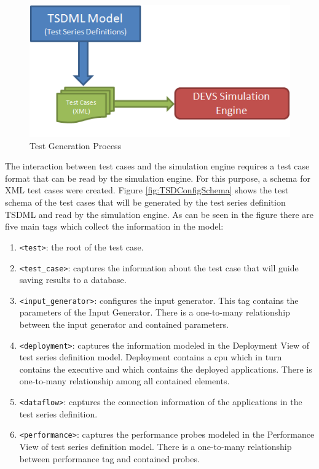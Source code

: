 \begin{figure}
	\centering
		\includegraphics{figures/TSDTestGen1.png}
	\caption{Test Generation Process}
	\label{fig:TSDTestGen1}
\end{figure}

The interaction between test cases and the simulation engine requires a test case format that can be read by the simulation engine. For this purpose, a schema for XML test cases were created. Figure \ref{fig:TSDConfigSchema} shows the test schema of the test cases that will be generated by the test series definition TSDML and read by the simulation engine. As can be seen in the figure there are five main tags which collect the information in the model:

\begin{enumerate}
	\item \verb|<test>|: the root of the test case.
	\item \verb|<test_case>|: captures the information about the test case that will guide saving results to a database.
	\item \verb|<input_generator>|: configures the input generator. This tag contains the parameters of the Input Generator. There is a one-to-many relationship between the input generator and contained parameters.
	\item \verb|<deployment>|: captures the information modeled in the Deployment View of test series definition model. Deployment contains a cpu which in turn contains the executive and which contains the deployed applications. There is one-to-many relationship among all contained elements.
	\item \verb|<dataflow>|: captures the connection information of the applications in the test series definition. 
	\item \verb|<performance>|: captures the performance probes modeled in the Performance View of test series definition model. There is a one-to-many relationship between performance tag and contained probes.
\end{enumerate}


